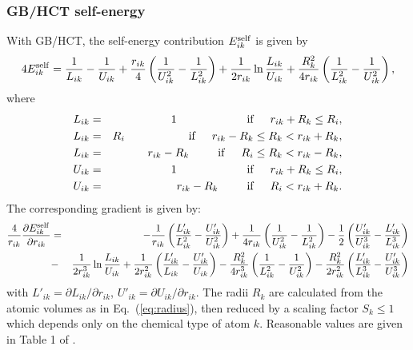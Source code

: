 \documentclass[12pt]{report}
\begin{document}
\subsubsection{GB/HCT self-energy}
With GB/HCT, the self-energy contribution $E_{ik}^{\rm self}$ is given by
\cite{Hawkins95}
\begin{equation}
4 E_{ik}^{\rm self} = \frac{1}{L_{ik}} - \frac{1}{U_{ik}} 
         + \frac{r_{ik}}{4} \left( \frac{1}{U^2_{ik}} - \frac{1}{L^2_{ik}} \right) 
         + \frac{1}{2r_{ik}} \ln \frac{L_{ik}}{U_{ik}} 
         + \frac{R_k^2}{4r_{ik}} \left( \frac{1}{L^2_{ik}} - \frac{1}{U^2_{ik}} \right),
\end{equation}
where
\begin{eqnarray}
L_{ik} &=& 1         
\hspace*{2.2cm} {\rm if } \hspace*{.5cm} r_{ik} + R_k \leq R_i, \nonumber \\
L_{ik} &=& R_i       
\hspace*{2cm} {\rm if } \hspace*{.5cm} r_{ik} - R_k \leq R_k < r_{ik} + R_k, \nonumber \\
L_{ik} &=& r_{ik} - R_k  
\hspace*{.9cm} {\rm if } \hspace*{.5cm} R_i \leq R_k < r_{ik} - R_k,  \\
U_{ik} &=& 1         
\hspace*{2.2cm} {\rm if } \hspace*{.5cm} r_{ik} + R_k \leq R_i, \nonumber \\
U_{ik} &=& r_{ik} - R_k      
\hspace*{.9cm} {\rm if }   \hspace*{.5cm} R_i < r_{ik} + R_k.
\end{eqnarray}
The corresponding gradient is given by:
\begin{eqnarray}
\frac{4}{r_{ik}} \frac{\partial E_{ik}^{\rm self}}{\partial r_{ik}} &=&
  - \frac{1}{r_{ik}} \left( \frac{L'_{ik}}{L_{ik}^2} - \frac{U'_{ik}}{U_{ik}^2} \right)
  + \frac{1}{4r_{ik}} \left( \frac{1}{U^2_{ik}} - \frac{1}{L^2_{ik}} \right)
  - \frac{1}{2} \left( \frac{U'_{ik}}{U^3_{ik}} - \frac{L'_{ik}}{L^3_{ik}} \right) 
\label{eq:bsolvhct}  \\
  &-& \frac{1}{2r^3_{ik}} \ln \frac{L_{ik}}{U_{ik}} 
  + \frac{1}{2r_{ik}^2} \left( \frac{L'_{ik}}{L_{ik}} - \frac{U'_{ik}}{U_{ik}} \right)
  - \frac{R_k^2}{4r^3_{ik}} \left( \frac{1}{L^2_{ik}} - \frac{1}{U^2_{ik}} \right) 
  - \frac{R_k^2}{2r^2_{ik}} \left( \frac{L'_{ik}}{L^3_{ik}} - \frac{U'_{ik}}{U^3_{ik}} \right)
\nonumber
\end{eqnarray}
with $L'_{ik} = \partial L_{ik} / \partial r_{ik}$, $U'_{ik} = \partial U_{ik} / \partial r_{ik}$.
The radii $R_k$ are calculated from the atomic volumes as in Eq.\ (\ref{eq:radius}),
then reduced by a scaling factor $S_k \leq 1$ which depends only on the chemical type of
atom $k$. Reasonable values are given in Table 1 of \cite{Hawkins95}.
\end{document}
